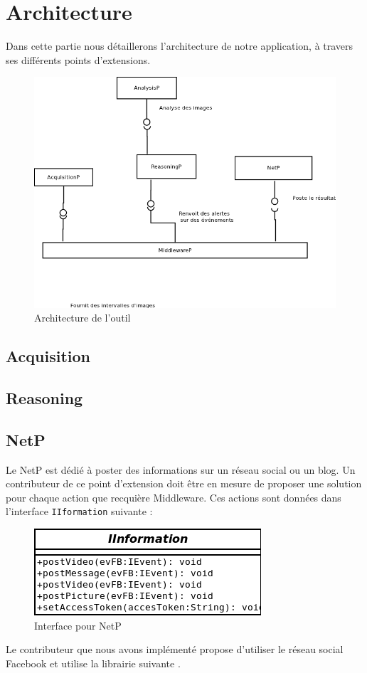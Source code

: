 \chapter{Architecture}
Dans cette partie nous détaillerons l'architecture de notre application, à travers ses différents points d'extensions.
\begin{figure}[htbp]
  \centering
  \includegraphics[scale=0.70]{img/archi}
  \caption{Architecture de l'outil}
  \label{fig:archi}
\end{figure}

\section{Acquisition}

\section{Reasoning}

\section{NetP}
Le  NetP est dédié à poster des informations sur un  réseau social ou un blog. Un contributeur de ce point d'extension doit être en mesure de proposer une solution pour chaque action que recquière Middleware. Ces actions sont données dans l'interface \verb+IIformation+ suivante :
\begin{figure}[htbp]
  \centering
  \includegraphics[scale=0.50]{img/iinterface}
  \caption{Interface pour NetP}
  \label{fig:IInterface}
\end{figure}

Le contributeur que nous avons implémenté propose d'utiliser le réseau social Facebook et utilise la librairie suivante \cite{restFB}.





